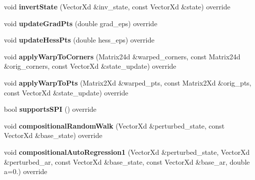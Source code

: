 \begin{DoxyCompactItemize}
\item 
\hypertarget{classTranslation_a6545683d641e738cb7a40962bef3a20f}{void {\bfseries invert\-State} (Vector\-Xd \&inv\-\_\-state, const Vector\-Xd \&state) override}\label{classTranslation_a6545683d641e738cb7a40962bef3a20f}

\item 
\hypertarget{classTranslation_acc8c6da89f233e3eb0c6a24485dc86e5}{void {\bfseries update\-Grad\-Pts} (double grad\-\_\-eps) override}\label{classTranslation_acc8c6da89f233e3eb0c6a24485dc86e5}

\item 
\hypertarget{classTranslation_a0a1a76ab5237aee96e0f4816ac595c89}{void {\bfseries update\-Hess\-Pts} (double hess\-\_\-eps) override}\label{classTranslation_a0a1a76ab5237aee96e0f4816ac595c89}

\item 
\hypertarget{classTranslation_ac2d5fa4b12cca8d1ad69798a80f9b65e}{void {\bfseries apply\-Warp\-To\-Corners} (Matrix24d \&warped\-\_\-corners, const Matrix24d \&orig\-\_\-corners, const Vector\-Xd \&state\-\_\-update) override}\label{classTranslation_ac2d5fa4b12cca8d1ad69798a80f9b65e}

\item 
\hypertarget{classTranslation_a2968efa401d0e25239ccfbe801ecc04b}{void {\bfseries apply\-Warp\-To\-Pts} (Matrix2\-Xd \&warped\-\_\-pts, const Matrix2\-Xd \&orig\-\_\-pts, const Vector\-Xd \&state\-\_\-update) override}\label{classTranslation_a2968efa401d0e25239ccfbe801ecc04b}

\item 
\hypertarget{classTranslation_a2687f9c291298edf232880234a0071ba}{bool {\bfseries supports\-S\-P\-I} () override}\label{classTranslation_a2687f9c291298edf232880234a0071ba}

\item 
\hypertarget{classTranslation_a1879ad9ff90ad5a605ede4a2e6c55aa4}{void {\bfseries compositional\-Random\-Walk} (Vector\-Xd \&perturbed\-\_\-state, const Vector\-Xd \&base\-\_\-state) override}\label{classTranslation_a1879ad9ff90ad5a605ede4a2e6c55aa4}

\item 
\hypertarget{classTranslation_ac6affcc275daf7a92716c05fa1abad77}{void {\bfseries compositional\-Auto\-Regression1} (Vector\-Xd \&perturbed\-\_\-state, Vector\-Xd \&perturbed\-\_\-ar, const Vector\-Xd \&base\-\_\-state, const Vector\-Xd \&base\-\_\-ar, double a=0.) override}\label{classTranslation_ac6affcc275daf7a92716c05fa1abad77}


\end{DoxyCompactItemize}
